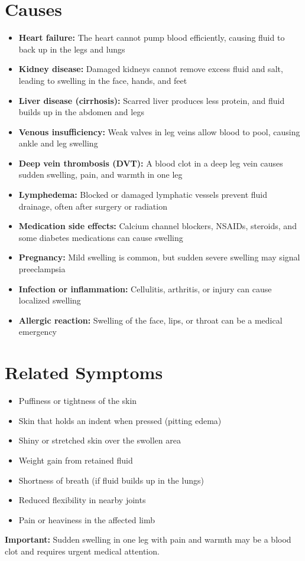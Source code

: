 \section*{Causes}
\begin{itemize}
  \item \textbf{Heart failure:} The heart cannot pump blood efficiently, causing fluid to back up in the legs and lungs
  \item \textbf{Kidney disease:} Damaged kidneys cannot remove excess fluid and salt, leading to swelling in the face, hands, and feet
  \item \textbf{Liver disease (cirrhosis):} Scarred liver produces less protein, and fluid builds up in the abdomen and legs
  \item \textbf{Venous insufficiency:} Weak valves in leg veins allow blood to pool, causing ankle and leg swelling
  \item \textbf{Deep vein thrombosis (DVT):} A blood clot in a deep leg vein causes sudden swelling, pain, and warmth in one leg
  \item \textbf{Lymphedema:} Blocked or damaged lymphatic vessels prevent fluid drainage, often after surgery or radiation
  \item \textbf{Medication side effects:} Calcium channel blockers, NSAIDs, steroids, and some diabetes medications can cause swelling
  \item \textbf{Pregnancy:} Mild swelling is common, but sudden severe swelling may signal preeclampsia
  \item \textbf{Infection or inflammation:} Cellulitis, arthritis, or injury can cause localized swelling
  \item \textbf{Allergic reaction:} Swelling of the face, lips, or throat can be a medical emergency
\end{itemize}

\section*{Related Symptoms}
\begin{itemize}
  \item Puffiness or tightness of the skin
  \item Skin that holds an indent when pressed (pitting edema)
  \item Shiny or stretched skin over the swollen area
  \item Weight gain from retained fluid
  \item Shortness of breath (if fluid builds up in the lungs)
  \item Reduced flexibility in nearby joints
  \item Pain or heaviness in the affected limb
\end{itemize}
\textbf{Important:} Sudden swelling in one leg with pain and warmth may be a blood clot and requires urgent medical attention.

